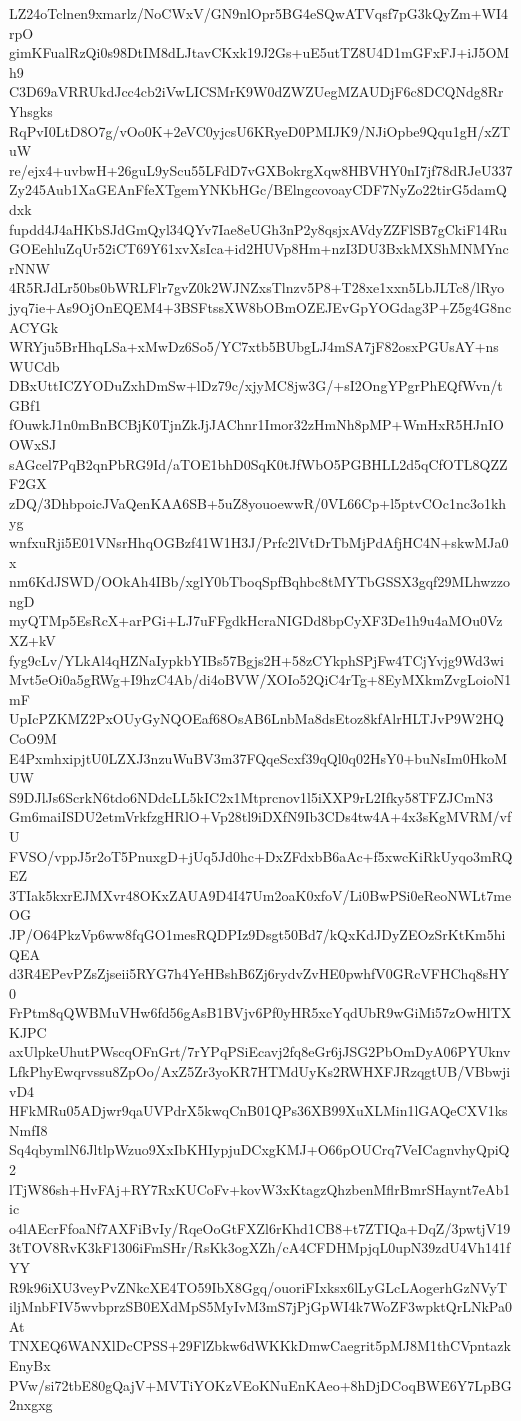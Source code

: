 LZ24oTclnen9xmarlz/NoCWxV/GN9nlOpr5BG4eSQwATVqsf7pG3kQyZm+WI4rpO
gimKFualRzQi0s98DtIM8dLJtavCKxk19J2Gs+uE5utTZ8U4D1mGFxFJ+iJ5OMh9
C3D69aVRRUkdJcc4cb2iVwLICSMrK9W0dZWZUegMZAUDjF6c8DCQNdg8RrYhsgks
RqPvI0LtD8O7g/vOo0K+2eVC0yjcsU6KRyeD0PMIJK9/NJiOpbe9Qqu1gH/xZTuW
re/ejx4+uvbwH+26guL9yScu55LFdD7vGXBokrgXqw8HBVHY0nI7jf78dRJeU337
Zy245Aub1XaGEAnFfeXTgemYNKbHGc/BElngcovoayCDF7NyZo22tirG5damQdxk
fupdd4J4aHKbSJdGmQyl34QYv7Iae8eUGh3nP2y8qsjxAVdyZZFlSB7gCkiF14Ru
GOEehluZqUr52iCT69Y61xvXsIca+id2HUVp8Hm+nzI3DU3BxkMXShMNMYncrNNW
4R5RJdLr50bs0bWRLFlr7gvZ0k2WJNZxsTlnzv5P8+T28xe1xxn5LbJLTc8/lRyo
jyq7ie+As9OjOnEQEM4+3BSFtssXW8bOBmOZEJEvGpYOGdag3P+Z5g4G8ncACYGk
WRYju5BrHhqLSa+xMwDz6So5/YC7xtb5BUbgLJ4mSA7jF82osxPGUsAY+nsWUCdb
DBxUttICZYODuZxhDmSw+lDz79c/xjyMC8jw3G/+sI2OngYPgrPhEQfWvn/tGBf1
fOuwkJ1n0mBnBCBjK0TjnZkJjJAChnr1Imor32zHmNh8pMP+WmHxR5HJnIOOWxSJ
sAGcel7PqB2qnPbRG9Id/aTOE1bhD0SqK0tJfWbO5PGBHLL2d5qCfOTL8QZZF2GX
zDQ/3DhbpoicJVaQenKAA6SB+5uZ8youoewwR/0VL66Cp+l5ptvCOc1nc3o1khyg
wnfxuRji5E01VNsrHhqOGBzf41W1H3J/Prfc2lVtDrTbMjPdAfjHC4N+skwMJa0x
nm6KdJSWD/OOkAh4IBb/xglY0bTboqSpfBqhbc8tMYTbGSSX3gqf29MLhwzzongD
myQTMp5EsRcX+arPGi+LJ7uFFgdkHcraNIGDd8bpCyXF3De1h9u4aMOu0VzXZ+kV
fyg9cLv/YLkAl4qHZNaIypkbYIBs57Bgjs2H+58zCYkphSPjFw4TCjYvjg9Wd3wi
Mvt5eOi0a5gRWg+I9hzC4Ab/di4oBVW/XOIo52QiC4rTg+8EyMXkmZvgLoioN1mF
UpIcPZKMZ2PxOUyGyNQOEaf68OsAB6LnbMa8dsEtoz8kfAlrHLTJvP9W2HQCoO9M
E4PxmhxipjtU0LZXJ3nzuWuBV3m37FQqeScxf39qQl0q02HsY0+buNsIm0HkoMUW
S9DJlJs6ScrkN6tdo6NDdcLL5kIC2x1Mtprcnov1l5iXXP9rL2Ifky58TFZJCmN3
Gm6maiISDU2etmVrkfzgHRlO+Vp28tl9iDXfN9Ib3CDs4tw4A+4x3sKgMVRM/vfU
FVSO/vppJ5r2oT5PnuxgD+jUq5Jd0hc+DxZFdxbB6aAc+f5xwcKiRkUyqo3mRQEZ
3TIak5kxrEJMXvr48OKxZAUA9D4I47Um2oaK0xfoV/Li0BwPSi0eReoNWLt7meOG
JP/O64PkzVp6ww8fqGO1mesRQDPIz9Dsgt50Bd7/kQxKdJDyZEOzSrKtKm5hiQEA
d3R4EPevPZsZjseii5RYG7h4YeHBshB6Zj6rydvZvHE0pwhfV0GRcVFHChq8sHY0
FrPtm8qQWBMuVHw6fd56gAsB1BVjv6Pf0yHR5xcYqdUbR9wGiMi57zOwHlTXKJPC
axUlpkeUhutPWscqOFnGrt/7rYPqPSiEcavj2fq8eGr6jJSG2PbOmDyA06PYUknv
LfkPhyEwqrvssu8ZpOo/AxZ5Zr3yoKR7HTMdUyKs2RWHXFJRzqgtUB/VBbwjivD4
HFkMRu05ADjwr9qaUVPdrX5kwqCnB01QPs36XB99XuXLMin1lGAQeCXV1ksNmfI8
Sq4qbymlN6JltlpWzuo9XxIbKHIypjuDCxgKMJ+O66pOUCrq7VeICagnvhyQpiQ2
lTjW86sh+HvFAj+RY7RxKUCoFv+kovW3xKtagzQhzbenMflrBmrSHaynt7eAb1ic
o4lAEcrFfoaNf7AXFiBvIy/RqeOoGtFXZl6rKhd1CB8+t7ZTIQa+DqZ/3pwtjV19
3tTOV8RvK3kF1306iFmSHr/RsKk3ogXZh/cA4CFDHMpjqL0upN39zdU4Vh141fYY
R9k96iXU3veyPvZNkcXE4TO59IbX8Ggq/ouoriFIxksx6lLyGLcLAogerhGzNVyT
iljMnbFIV5wvbprzSB0EXdMpS5MyIvM3mS7jPjGpWI4k7WoZF3wpktQrLNkPa0At
TNXEQ6WANXlDcCPSS+29FlZbkw6dWKKkDmwCaegrit5pMJ8M1thCVpntazkEnyBx
PVw/si72tbE80gQajV+MVTiYOKzVEoKNuEnKAeo+8hDjDCoqBWE6Y7LpBG2nxgxg
